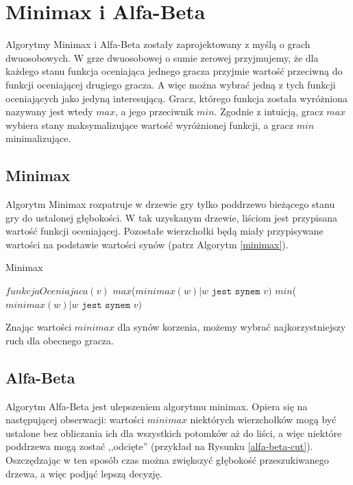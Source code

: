 \documentclass{pracamgr}
\begin{document}
\section{Minimax i Alfa-Beta}

Algorytmy Minimax i Alfa-Beta zostały zaprojektowany z myślą o grach dwuosobowych.
W grze dwuosobowej o sumie zerowej przyjmujemy, że dla każdego stanu funkcja oceniająca jednego gracza przyjmie wartość przeciwną do funkcji oceniającej drugiego gracza.
A więc można wybrać jedną z tych funkcji oceniających jako jedyną interesującą.
Gracz, którego funkcja została wyróżniona nazywany jest wtedy \(max\), a jego przeciwnik \(min\).
Zgodnie z intuicją, gracz \(max\) wybiera stany maksymalizujące wartość wyróżnionej funkcji, a gracz \(min\) minimalizujące.

\subsection{Minimax}

Algorytm Minimax rozpatruje w drzewie gry tylko poddrzewo bieżącego stanu gry do ustalonej głębokości. W tak uzyskanym drzewie, liściom jest przypisana wartość funkcji oceniającej.
Pozostałe wierzchołki będą miały przypisywane wartości na podstawie wartości synów (patrz Algorytm \ref{minimax}).

\begin{algorytm}
\caption{Minimax\label{minimax}}
\begin{algorithmic}[1]
	\State \Return $funkcjaOceniajaca(v)$
\EndIf
{}
    \State \Return $max$($minimax(w) | \texttt{\(w\) jest synem \(v\)})$
\Else
    \State \Return $min$($minimax(w) | \texttt{\(w\) jest synem \(v\)})$
\EndIf
\EndFunction
\end{algorithmic}
\end{algorytm}

Znając wartości \(minimax\) dla synów korzenia, możemy wybrać najkorzystniejszy ruch dla obecnego gracza.

\subsection{Alfa-Beta}

Algorytm Alfa-Beta jest ulepszeniem algorytmu minimax.
Opiera się na następującej obserwacji: wartości \(minimax\) niektórych wierzchołków mogą być ustalone bez obliczania ich dla wszystkich potomków aż do liści, a więc niektóre poddrzewa mogą zostać ,,odcięte'' (przykład na Rysunku \ref{alfa-beta-cut}).
Oszczędzając w ten sposób czas można zwiększyć głębokość przeszukiwanego drzewa, a więc podjąć lepszą decyzję.
\end{document}
